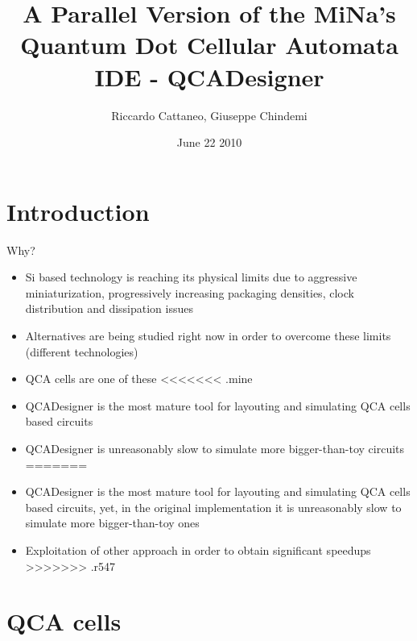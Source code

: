\documentclass[10pt, red]{beamer}
\title[CUDAQCADesigner]{A Parallel Version of the MiNa's Quantum Dot Cellular Automata IDE - QCADesigner}
\author{Riccardo Cattaneo, Giuseppe Chindemi}
\institute{
  Politecnico di Milano\\
  HPPS
}
\date{June 22 2010}
\begin{document}
\begin{frame}
  \titlepage
\end{frame}

\section{Introduction}
	\begin{frame}{Why?}
		\begin{itemize} 
			\item Si based technology is reaching its physical limits due to aggressive miniaturization, progressively increasing packaging densities, clock distribution and dissipation issues
			\item Alternatives are being studied right now in order to overcome these limits (different technologies)
			\item QCA cells are one of these
<<<<<<< .mine
			\item QCADesigner is the most mature tool for layouting and simulating QCA cells based circuits
			\item QCADesigner is unreasonably slow to simulate more bigger-than-toy circuits
=======
			\item QCADesigner is the most mature tool for layouting and simulating QCA cells based circuits, yet, in the original implementation it is unreasonably slow to simulate more bigger-than-toy ones
			\item Exploitation of other approach in order to obtain significant speedups
>>>>>>> .r547
		\end{itemize}
	\end{frame}


\section{QCA cells}

%	
\end{document}
